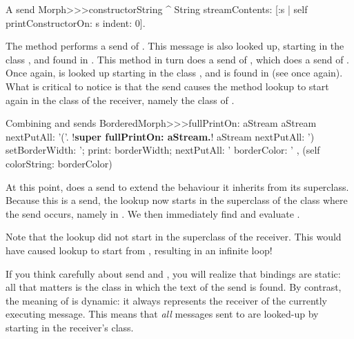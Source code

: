 \documentclass[a4paper,10pt,twoside]{book}
\begin{document}
\begin{method}[constructorString]{A \self send}
Morph>>>constructorString
	^ String streamContents: [:s | self printConstructorOn: s indent: 0].
\end{method}
The method  performs a \self send of .
This message is also looked up, starting in the class , and found in .
This method in turn does a \self send of , which does a \self send of .
Once again,  is looked up starting in the class , and  is found in  (see  once again).
What is critical to notice is that the \self send causes the method lookup to start again in the class of the receiver, namely the class of .


\begin{method}[fullPrintOn]{Combining \super and \self sends}
BorderedMorph>>>fullPrintOn: aStream
	aStream nextPutAll: '('.
	!\textbf{super fullPrintOn: aStream.}!
	aStream nextPutAll: ') setBorderWidth: '; print: borderWidth;
		nextPutAll: ' borderColor: ' , (self colorString: borderColor)
\end{method}
At this point,  does a \super send to extend the 
 behaviour it inherits from its superclass.
Because this is a \super send, the lookup now starts in the superclass of the class where the \super send occurs, namely in .
We then immediately find and evaluate .

Note that the \super lookup did not start in the superclass of the receiver.
This would have caused lookup to start from , resulting in an infinite loop!


If you think carefully about \super send and , you will realize that \super bindings are static: all that matters is the class in which the text of the \super send is found.
By contrast, the meaning of \self is dynamic: it always represents the receiver of the currently executing message. This means that  \emph{all}  messages sent to \self are looked-up by starting in the receiver's class.
\end{document}
